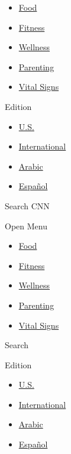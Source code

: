 \begin{itemize}
\tightlist
\item
  \href{/specials/health/food-diet}{Food}
\item
  \href{/specials/health/fitness-excercise}{Fitness}
\item
  \href{/specials/health/wellness}{Wellness}
\item
  \href{/specials/health/parenting}{Parenting}
\item
  \href{/specials/health/vital-signs}{Vital Signs}
\end{itemize}

Edition

\begin{itemize}
\tightlist
\item
  \href{//us.cnn.com?hpt=header_edition-picker}{U.S.}
\item
  \href{//edition.cnn.com?hpt=header_edition-picker}{International}
\item
  \href{//arabic.cnn.com?hpt=header_edition-picker}{Arabic}
\item
  \href{//cnnespanol.cnn.com?hpt=header_edition-picker}{Español}
\end{itemize}

Search CNN

Open Menu

\begin{itemize}
\tightlist
\item
  \href{/specials/health/food-diet}{Food}
\item
  \href{/specials/health/fitness-excercise}{Fitness}
\item
  \href{/specials/health/wellness}{Wellness}
\item
  \href{/specials/health/parenting}{Parenting}
\item
  \href{/specials/health/vital-signs}{Vital Signs}
\end{itemize}

Search

Edition

\begin{itemize}
\tightlist
\item
  \href{//us.cnn.com?hpt=header_edition-picker}{U.S.}
\item
  \href{//edition.cnn.com?hpt=header_edition-picker}{International}
\item
  \href{//arabic.cnn.com?hpt=header_edition-picker}{Arabic}
\item
  \href{//cnnespanol.cnn.com?hpt=header_edition-picker}{Español}
\end{itemize}

